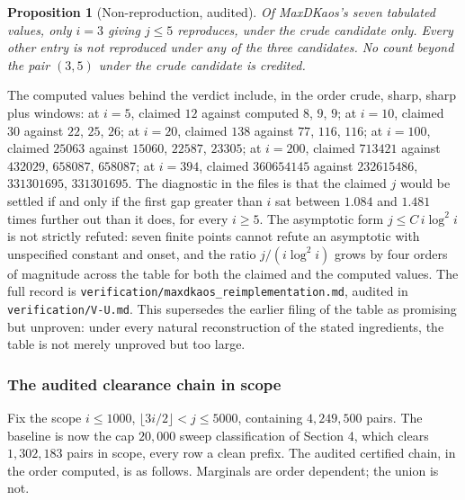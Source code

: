 \documentclass[11pt]{article}
\newtheorem{proposition}[theorem]{Proposition}
\theoremstyle{remark}
\begin{document}
\begin{proposition}[Non-reproduction, audited]
\label{prop:maxdkaos}
Of MaxDKaos's seven tabulated values, only $i=3$ giving $j\le 5$ reproduces, under the crude candidate only. Every other entry is not reproduced under any of the three candidates. No count beyond the pair $(3,5)$ under the crude candidate is credited.
\end{proposition}

The computed values behind the verdict include, in the order crude, sharp, sharp plus windows: at $i=5$, claimed $12$ against computed $8$, $9$, $9$; at $i=10$, claimed $30$ against $22$, $25$, $26$; at $i=20$, claimed $138$ against $77$, $116$, $116$; at $i=100$, claimed $25063$ against $15060$, $22587$, $23305$; at $i=200$, claimed $713421$ against $432029$, $658087$, $658087$; at $i=394$, claimed $360654145$ against $232615486$, $331301695$, $331301695$. The diagnostic in the files is that the claimed $j$ would be settled if and only if the first gap greater than $i$ sat between $1.084$ and $1.481$ times further out than it does, for every $i\ge 5$. The asymptotic form $j\le C\,i\log^2 i$ is not strictly refuted: seven finite points cannot refute an asymptotic with unspecified constant and onset, and the ratio $j/(i\log^2 i)$ grows by four orders of magnitude across the table for both the claimed and the computed values. The full record is \texttt{verification/maxdkaos\_reimplementation.md}, audited in \texttt{verification/V-U.md}. This supersedes the earlier filing of the table as promising but unproven: under every natural reconstruction of the stated ingredients, the table is not merely unproved but too large.

\subsubsection{The audited clearance chain in scope}

Fix the scope $i\le 1000$, $\lfloor 3i/2\rfloor<j\le 5000$, containing $4{,}249{,}500$ pairs. The baseline is now the cap $20{,}000$ sweep classification of Section 4, which clears $1{,}302{,}183$ pairs in scope, every row a clean prefix. The audited certified chain, in the order computed, is as follows. Marginals are order dependent; the union is not.
\end{document}
